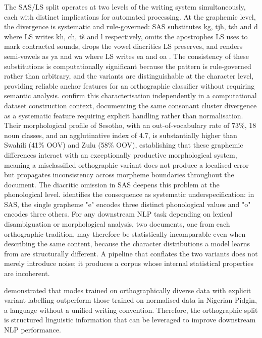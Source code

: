 \documentclass[11pt,a4paper]{article}
\begin{document}
The SAS/LS split operates at two levels of the writing system simultaneously, each with distinct implications for automated processing. At the graphemic level, the divergence is systematic and rule-governed: SAS substitutes kg, tjh, tsh and d where LS writes kh, ch, tš and l respectively, omits the apostrophes LS uses to mark contracted sounds, drops the vowel diacritics LS preserves, and renders semi-vowels as ya and wa where LS writes ea and oa \citep{makutoane2022people}. The consistency of these substitutions is computationally significant because the pattern is rule-governed rather than arbitrary, and the variants are distinguishable at the character level, providing reliable anchor features for an orthographic classifier without requiring semantic analysis. \citet{motaung2025sesoda} confirm this characterisation independently in a computational dataset construction context, documenting the same consonant cluster divergence as a systematic feature requiring explicit handling rather than normalisation. Their morphological profile of Sesotho, with an out-of-vocabulary rate of 73\%, 18 noun classes, and an agglutinative index of 4.7, is substantially higher than Swahili (41\% OOV) and Zulu (58\% OOV), establishing that these graphemic differences interact with an exceptionally productive morphological system, meaning a misclassified orthographic variant does not produce a localised error but propagates inconsistency across morpheme boundaries throughout the document. The diacritic omission in SAS deepens this problem at the phonological level. \citet{matlosa2017sesotho} identifies the consequence as systematic underspecification: in SAS, the single grapheme "e" encodes three distinct phonological values and "o" encodes three others. For any downstream NLP task depending on lexical disambiguation or morphological analysis, two documents, one from each orthographic tradition, may therefore be statistically incomparable even when describing the same content, because the character distributions a model learns from are structurally different. A pipeline that conflates the two variants does not merely introduce noise; it produces a corpus whose internal statistical properties are incoherent.

\citet{lin-etal-2024-modeling} demonstrated that modes trained on orthographically diverse data with explicit variant labelling outperform those trained on normalised data in Nigerian Pidgin, a language without a unified writing convention. Therefore, the orthographic split is structured linguistic information that can be leveraged to improve downstream NLP performance.
\end{document}
